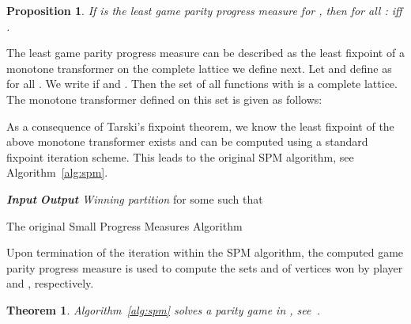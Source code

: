 \documentclass{eptcs}
\newtheorem{theo}{Theorem}
\newtheorem{prop}{Proposition}
\newenvironment{theorem}{\begin{theo} \rm }{\end{theo}}
\newenvironment{proposition}{\begin{prop} \rm }{\end{prop}}
\begin{document}
\begin{proposition}\label{prop:jurdzinski}
If  is the \emph{least} game parity progress measure for , 
then for all :
 iff .
\end{proposition}
The least game parity progress measure can be described as the least fixpoint
of a monotone transformer on the complete lattice we define next. Let
 and define
 as  for all . We write
 if  and . Then
the set of all functions  with  is a complete
lattice. The monotone transformer defined on this set is given as follows:

As a consequence of Tarski's fixpoint theorem, we know the least fixpoint of the
above monotone transformer exists and can be computed using a standard fixpoint iteration
scheme. This leads to the original SPM algorithm, see Algorithm~\ref{alg:spm}.
\begin{algorithm}[h!t]
\begin{algorithmic}[1]
\State \emph{\textbf{Input} }
\State \emph{\textbf{Output} Winning partition }
\State 
{}
  \State  for some  such that 
\EndWhile
\State \Return 
\EndFunction
\end{algorithmic}
\caption{The original Small Progress Measures Algorithm}
\label{alg:spm}
\end{algorithm}
Upon termination of the iteration within the SPM algorithm, the
computed game parity progress measure  is used to compute the
sets  and  of vertices won by player  and
, respectively.
\begin{theorem} Algorithm~\ref{alg:spm} solves a parity
game in , see~\cite{Jur:00}.
\end{theorem}
\end{document}
